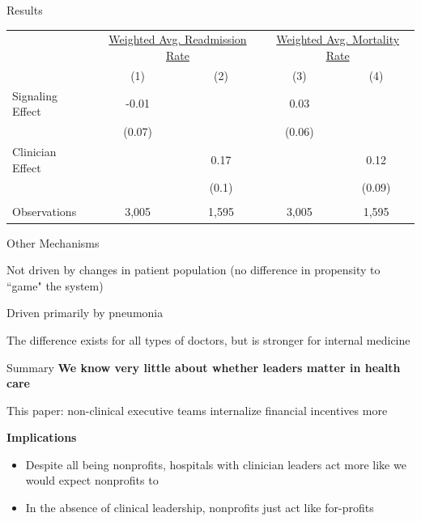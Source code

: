 \documentclass[notes,11pt, aspectratio=169]{beamer}
\newenvironment{wideitemize}{\itemize\addtolength{\itemsep}{10pt}}{\enditemize}
\begin{document}
\begin{frame}{Results}\normalsize
    \begin{table}[ht!]
\centering
\begin{tabular}[t]{lcccc}
\toprule
\multicolumn{1}{c}{ } & \multicolumn{2}{c}{\underline{Weighted Avg. Readmission Rate}} & \multicolumn{2}{c}{\underline{Weighted Avg. Mortality Rate}} \\
 & (1) & (2) & (3) & (4)\\
\midrule
Signaling Effect & -0.01 &  & 0.03 & \\
 & (0.07) &  & (0.06) & \\
Clinician Effect &  & 0.17 &  & 0.12\\
 &  & (0.1) &  & (0.09)\\
 &  &  &  & \\
Observations & 3,005 & 1,595 & 3,005 & 1,595\\
\bottomrule
\end{tabular}
\end{table}
\end{frame}

\begin{frame}{Other Mechanisms}
\large
    \begin{wideitemize}
        \item Not driven by changes in patient population (no difference in propensity to ``game" the system)
        \item Driven primarily by pneumonia
        \item The difference exists for all types of doctors, but is stronger for internal medicine 
    \end{wideitemize}
\end{frame}

\begin{frame}{Summary}
\large
    \textbf{We know very little about whether leaders matter in health care}

    \begin{wideitemize}
        \item This paper: non-clinical executive teams internalize financial incentives more
    \end{wideitemize}

    \vspace{10mm}
    
    \textbf{Implications}
    \begin{itemize}
        \item Despite all being nonprofits, hospitals with clinician leaders act more like we would expect nonprofits to
        \item In the absence of clinical leadership, nonprofits just act like for-profits
    \end{itemize}



\end{frame}
\end{document}
